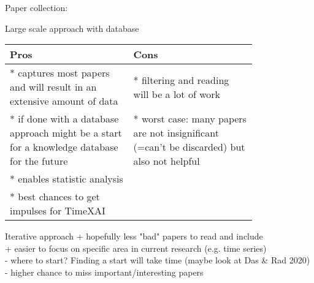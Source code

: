 \documentclass[presentation]{beamer}
\begin{document}
\begin{frame}[label={sec:orgedcff66}]{Paper collection:}
\begin{block}{Large scale approach with database}
\begin{table}
\centering
\begin{tabular}{p{0.4\linewidth} | p{0.4\linewidth}}
 Pros & Cons  \\\hline
 * captures most papers and will result in an extensive amount of data & * filtering and reading will be a lot of work \\
 * if done with a database approach might be a start for a knowledge database for the future & * worst case: many papers are not insignificant (=can't be discarded) but also not helpful \\
 * enables statistic analysis &  \\
 * best chances to get impulses for TimeXAI & 
\end{tabular}
\end{table}
\end{block}

\begin{block}{Iterative approach}
+ hopefully less "bad" papers to read and include\\
+ easier to focus on specific area in current research (e.g. time series)\\
- where to start? Finding a start will take time (maybe look at Das \& Rad 2020)\\
- higher chance to miss important/interesting papers\\
\end{block}
\end{frame}

\end{document}
